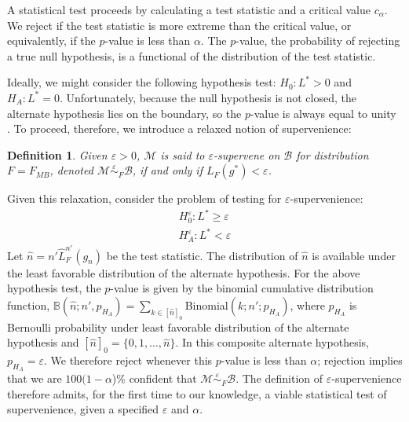 \documentclass{article}
\newcommand{\mB}{\mathcal{B}}
\newcommand{\mM}{\mathcal{M}}
\newcommand{\eps}{\varepsilon}
\providecommand{\mc}[1]{\mathcal{#1}}
\providecommand{\mh}[1]{\widehat{#1}}
\newcommand{\hL}{\widehat{L}}
\newcommand{\MeB}{\mM \overset{\varepsilon}{{\sim}}_{F} \mB}
\newtheorem{defi}{Definition}
\begin{document}
A statistical test proceeds by calculating a test statistic and a critical value $c_\alpha$.  We reject if the test statistic is more extreme than the critical value, or equivalently, if the $p$-value is less than $\alpha$.   The $p$-value, the probability of rejecting a true null hypothesis, is a functional of the distribution of the test statistic. 

Ideally, we might consider the following hypothesis test: $H_0: L^*>0$ and $H_A: L^*=0$.  Unfortunately, because the null hypothesis is not closed, the alternate hypothesis lies on the boundary, so the $p$-value is always equal to unity \cite{Bickel2000}.  To proceed, therefore, we introduce a relaxed notion of supervenience:
\begin{defi}
\label{def2}
Given $\varepsilon > 0$, $\mM$ is said to $\varepsilon$-\textit{supervene} on $\mB$ for distribution $F=F_{MB}$, denoted $\MeB$, if and only if $L_{F}(g^*) < \varepsilon$.
\end{defi}
\noindent Given this relaxation, consider the problem of testing for $\eps$-supervenience:
\begin{align*}
	H_0^{\eps}: L^* \geq \eps \\
	H_A^{\eps}: L^* < \eps
\end{align*}
Let $\mh{n}= n' \hL^{n'}_{F}(g_n)$ be the test statistic.  The distribution of $\mh{n}$ is available under the least favorable distribution of the alternate hypothesis.  For the above hypothesis test,  the $p$-value is given by the binomial cumulative distribution function, $\mathbb{B}(\mh{n}; n', p_{H_A})= \sum_{k \in [\mh{n}]_0}$Binomial$(k; n'; p_{H_A})$, where $p_{H_A}$ is Bernoulli probability under least favorable distribution of the alternate hypothesis and $[\mh{n}]_0=\{0,1,\ldots, \mh{n}\}$.  In this composite alternate hypothesis, $p_{H_A}=\eps$.  We therefore reject whenever this $p$-value is less than $\alpha$; rejection implies that we are $100(1-\alpha$)\% confident that $\MeB$.   The definition of $\eps$-supervenience therefore admits, for the first time to our knowledge, a viable statistical test of supervenience, given a specified $\eps$ and $\alpha$. 



\end{document}
